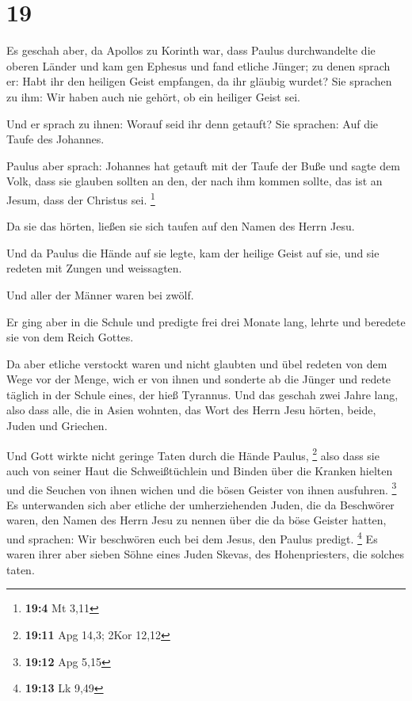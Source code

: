 \hypertarget{section-5}{%
\section{19}\label{section-5}}

 Es geschah aber, da Apollos zu Korinth war, dass Paulus
durchwandelte die oberen Länder und kam gen Ephesus und fand etliche
Jünger;  zu denen sprach er: Habt ihr den heiligen Geist
empfangen, da ihr gläubig wurdet? Sie sprachen zu ihm: Wir haben auch
nie gehört, ob ein heiliger Geist sei.

 Und er sprach zu ihnen: Worauf seid ihr denn getauft? Sie
sprachen: Auf die Taufe des Johannes.

 Paulus aber sprach: Johannes hat getauft mit der Taufe der
Buße und sagte dem Volk, dass sie glauben sollten an den, der nach ihm
kommen sollte, das ist an Jesum, dass der Christus sei. \footnote{\textbf{19:4}
  Mt 3,11}

 Da sie das hörten, ließen sie sich taufen auf den Namen des
Herrn Jesu.

 Und da Paulus die Hände auf sie legte, kam der heilige
Geist auf sie, und sie redeten mit Zungen und weissagten.

 Und aller der Männer waren bei zwölf.

 Er ging aber in die Schule und predigte frei drei Monate
lang, lehrte und beredete sie von dem Reich Gottes.

 Da aber etliche verstockt waren und nicht glaubten und übel
redeten von dem Wege vor der Menge, wich er von ihnen und sonderte ab
die Jünger und redete täglich in der Schule eines, der hieß Tyrannus.
 Und das geschah zwei Jahre lang, also dass alle, die in
Asien wohnten, das Wort des Herrn Jesu hörten, beide, Juden und
Griechen.

 Und Gott wirkte nicht geringe Taten durch die Hände
Paulus, \footnote{\textbf{19:11} Apg 14,3; 2Kor 12,12} 
also dass sie auch von seiner Haut die Schweißtüchlein und Binden über
die Kranken hielten und die Seuchen von ihnen wichen und die bösen
Geister von ihnen ausfuhren. \footnote{\textbf{19:12} Apg 5,15}
 Es unterwanden sich aber etliche der umherziehenden Juden,
die da Beschwörer waren, den Namen des Herrn Jesu zu nennen über die da
böse Geister hatten, und sprachen: Wir beschwören euch bei dem Jesus,
den Paulus predigt. \footnote{\textbf{19:13} Lk 9,49}  Es
waren ihrer aber sieben Söhne eines Juden Skevas, des Hohenpriesters,
die solches taten.

